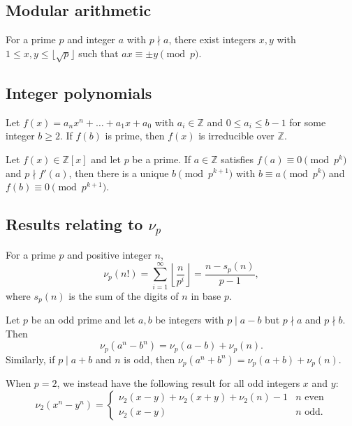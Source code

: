 \documentclass[11pt]{scrartcl}
\providecommand{\ZZ}{\mathbb Z}
\begin{document}
\subsection{Modular arithmetic}
\begin{theorem}
  For a prime $p$ and integer $a$ with $p \nmid a$,
  there exist integers $x, y$ with $1 \le x, y \le \lfloor \sqrt{p} \rfloor$
  such that $ax \equiv \pm y \pmod{p}$.
\end{theorem}

\subsection{Integer polynomials}
\begin{theorem}
  Let $f(x) = a_n x^n + \dots + a_1 x + a_0$ with $a_i \in \ZZ$
  and $0 \le a_i \le b - 1$ for some integer $b \ge 2$.
  If $f(b)$ is prime, then $f(x)$ is irreducible over $\ZZ$.
\end{theorem}

\begin{theorem}
  Let $f(x) \in \ZZ[x]$ and let $p$ be a prime.
  If $a \in \ZZ$ satisfies $f(a) \equiv 0 \pmod{p^k}$ and $p \nmid f'(a)$,
  then there is a unique $b \pmod{p^{k+1}}$ with $b \equiv a \pmod{p^k}$
  and $f(b) \equiv 0 \pmod{p^{k+1}}$.
\end{theorem}

\subsection{Results relating to $\nu_p$}
\begin{theorem}
  For a prime $p$ and positive integer $n$,
  \[ \nu_p(n!) = \sum_{i=1}^{\infty} \left\lfloor \frac{n}{p^i} \right\rfloor
    = \frac{n - s_p(n)}{p-1}, \]
  where $s_p(n)$ is the sum of the digits of $n$ in base $p$.
\end{theorem}

\begin{theorem}
  Let $p$ be an odd prime and let $a, b$ be integers with
  $p \mid a - b$ but $p \nmid a$ and $p \nmid b$.
  Then
  \[ \nu_p(a^n - b^n) = \nu_p(a - b) + \nu_p(n). \]
  Similarly, if $p \mid a + b$ and $n$ is odd,
  then $\nu_p(a^n + b^n) = \nu_p(a + b) + \nu_p(n)$.

  When $p=2$, we instead have the following result for all odd integers $x$ and $y$:
  \[
    \nu_2(x^n-y^n)
    = \begin{cases}
      \nu_2(x-y) + \nu_2(x+y) + \nu_2(n) - 1 & n \text{ even} \\
      \nu_2(x-y) & n \text{ odd}.
    \end{cases}
  \]
\end{theorem}
\end{document}
